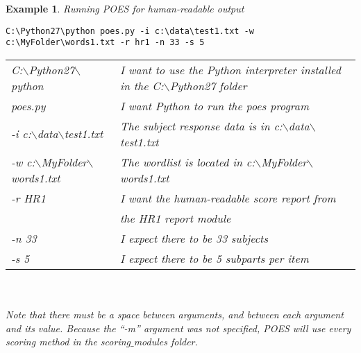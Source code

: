 \documentclass[11pt]{article}
\newcommand{\bsl}{$\backslash$}
\numberwithin{figure}{section}
\numberwithin{table}{section}
\newtheorem{example}{Example}[section]
\begin{document}
\newpage
\begin{example}{Running POES for human-readable output}
\small
\begin{verbatim}
C:\Python27\python poes.py -i c:\data\test1.txt -w c:\MyFolder\words1.txt -r hr1 -n 33 -s 5 
\end{verbatim}
\begin{tabular}{ll}
C:\bsl{}Python27\bsl{}python & I want to use the Python interpreter installed in the C:\bsl{}Python27 folder\\
poes.py & I want Python to run the poes program\\
-i c:\bsl{}data\bsl{}test1.txt	& The subject response data is in c:\bsl{}data\bsl{}test1.txt\\
-w c:\bsl{}MyFolder\bsl{}words1.txt	& The wordlist is located in c:\bsl{}MyFolder\bsl{}words1.txt\\
-r HR1 	& I want the human-readable score report from \\
&the HR1 report module\\
-n 33	& I expect there to be 33 subjects\\
-s 5	& I expect there to be 5 subparts per item\\
\end{tabular}
\\~\\Note that there must be a space between arguments, and between each 
argument and its value.  Because the ``-m'' argument was not specified, POES will use every scoring method in the scoring$\_$modules folder.
\end{example}
\end{document}
